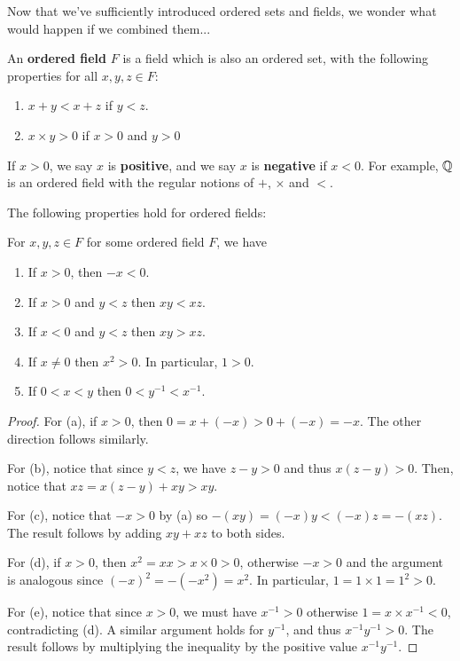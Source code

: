 Now that we've sufficiently introduced ordered sets and fields, we wonder what would happen if we combined them...

\begin{definition}
An \textbf{ordered field} $F$ is a field which is also an ordered set, with the following properties for all $x, y, z \in F$:
\begin{enumerate}
\item $x + y < x + z$ if $y < z$.
\item $x \times y > 0$ if $x > 0$ and $y > 0$
\end{enumerate}

If $x > 0$, we say $x$ is \textbf{positive}, and we say $x$ is \textbf{negative} if $x < 0$. For example, $\mathbb{Q}$ is an ordered field with the regular notions of $+$, $\times$ and $<$. 
\end{definition}

The following properties hold for ordered fields:
\begin{proposition}
For $x, y, z \in F$ for some ordered field $F$, we have
\begin{enumerate}
\item If $x > 0$, then $-x < 0$.
\item If $x > 0$ and $y < z$ then $xy < xz$.
\item If $x < 0$ and $y < z$ then $xy > xz$.
\item If $x \ne 0$ then $x^2 > 0$. In particular, $1 > 0$.
\item If $0 < x < y$ then $0 < y^{-1} < x^{-1}$. 
\end{enumerate}
\begin{proof}
For (a), if $x > 0$, then $0 = x + (-x) > 0 + (-x) = -x$. The other direction follows similarly. 

For (b), notice that since $y < z$, we have $z - y > 0$ and thus $x (z - y) > 0$. Then, notice that $xz = x (z - y) + xy > xy$. 

For (c), notice that $-x > 0$ by (a) so $-(xy) = (-x)y < (-x)z = -(xz)$. The result follows by adding $xy + xz$ to both sides.

For (d), if $x > 0$, then $x^2 = xx > x \times 0 > 0$, otherwise $-x > 0$ and the argument is analogous since $(-x)^2 = -(-x^2) = x^2$. In particular, $1 = 1 \times 1 = 1^2 > 0$. 

For (e), notice that since $x > 0$, we must have $x^{-1} > 0$ otherwise $1 = x \times x^{-1} < 0$, contradicting (d). A similar argument holds for $y^{-1}$, and thus $x^{-1}y^{-1} > 0$. The result follows by multiplying the inequality by the positive value $x^{-1}y^{-1}$. 
\end{proof}
\end{proposition}

